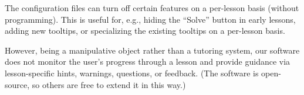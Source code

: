 \documentclass[11pt,letterpaper]{article}
\begin{document}
The configuration files can turn off certain features on a per-lesson basis (without programming).  This is 
useful for, e.g., hiding the ``Solve'' button in early lessons, adding new tooltips, or specializing
the existing tooltips on a per-lesson basis.

However, being a manipulative object rather than a tutoring system, our
software does not monitor the user's progress through a lesson and
provide guidance via lesson-specific hints, warnings, questions, or
feedback.  (The software is open-source, so others are free to extend
it in this way.)

\end{document}
